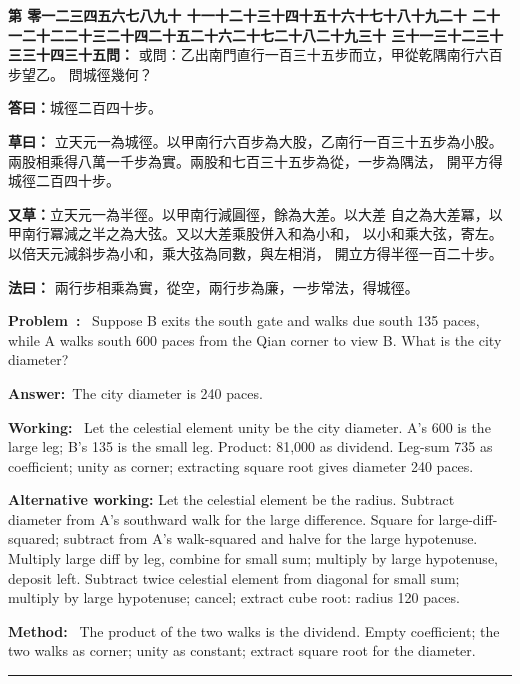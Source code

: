 \documentclass[9pt,a4paper]{article}
\newcounter{probnum}
\newcounter{overallnum}
\newcommand{\chnum}[1]{%
  \ifcase#1 零\or 一\or 二\or 三\or 四\or 五\or 六\or 七\or 八\or 九\or 十\or
    十一\or 十二\or 十三\or 十四\or 十五\or 十六\or 十七\or 十八\or 十九\or 二十\or
    二十一\or 二十二\or 二十三\or 二十四\or 二十五\or 二十六\or 二十七\or 二十八\or 二十九\or 三十\or
    三十一\or 三十二\or 三十三\or 三十四\or 三十五\fi}
\newcommand{\problem}[1]{\stepcounter{probnum}\stepcounter{overallnum}\par\noindent\textbf{\color{volcolor}第\chnum{\value{probnum}}問：}#1\par\vspace{0.15cm}}
\newcommand{\answer}[1]{\par\noindent\textbf{答曰：}#1\par\vspace{0.15cm}}
\newcommand{\working}[1]{\par\noindent\textbf{草曰：}#1\par\vspace{0.15cm}}
\newcommand{\method}[1]{\par\noindent\textbf{法曰：}#1\par\vspace{0.25cm}}
\newcommand{\eproblem}[1]{\par\noindent\textbf{\color{volcolor}Problem~\theoverallnum:}~#1\par\vspace{0.15cm}}
\newcommand{\eanswer}[1]{\par\noindent\textbf{Answer:}~#1\par\vspace{0.15cm}}
\newcommand{\eworking}[1]{\par\noindent\textbf{Working:}~#1\par\vspace{0.15cm}}
\newcommand{\emethod}[1]{\par\noindent\textbf{Method:}~#1\par\vspace{0.25cm}}
\begin{document}
\noindent\begin{minipage}[t]{0.48\textwidth}
\problem{
或問：乙出南門直行一百三十五步而立，甲從乾隅南行六百步望乙。
問城徑幾何？
}

\answer{城徑二百四十步。}

\working{
立天元一為城徑。以甲南行六百步為大股，乙南行一百三十五步為小股。
兩股相乘得八萬一千步為實。兩股和七百三十五步為從，一步為隅法，
開平方得城徑二百四十步。

\textbf{又草：}立天元一為半徑。以甲南行減圓徑，餘為大差。以大差
自之為大差冪，以甲南行冪減之半之為大弦。又以大差乘股併入和為小和，
以小和乘大弦，寄左。以倍天元減斜步為小和，乘大弦為同數，與左相消，
開立方得半徑一百二十步。
}

\method{
兩行步相乘為實，從空，兩行步為廉，一步常法，得城徑。
}
\end{minipage}%
\hfill%
\begin{minipage}[t]{0.50\textwidth}
\eproblem{
Suppose B exits the south gate and walks due south 135 paces, while A walks
south 600 paces from the Qian corner to view B. What is the city diameter?
}

\eanswer{The city diameter is 240 paces.}

\eworking{
Let the celestial element unity be the city diameter. A's 600 is the large
leg; B's 135 is the small leg. Product: 81,000 as dividend. Leg-sum 735 as
coefficient; unity as corner; extracting square root gives diameter 240 paces.

\textbf{Alternative working:} Let the celestial element be the radius. Subtract
diameter from A's southward walk for the large difference. Square for
large-diff-squared; subtract from A's walk-squared and halve for the large
hypotenuse. Multiply large diff by leg, combine for small sum; multiply by
large hypotenuse, deposit left. Subtract twice celestial element from diagonal
for small sum; multiply by large hypotenuse; cancel; extract cube root:
radius 120 paces.
}

\emethod{
The product of the two walks is the dividend. Empty coefficient; the two
walks as corner; unity as constant; extract square root for the diameter.
}
\end{minipage}
\vspace{0.15cm}

\vspace{0.15cm}
\noindent\rule{\textwidth}{0.2pt}
\vspace{0.15cm}
\end{document}

